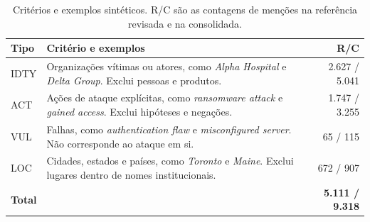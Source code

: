 \begin{table}[ht]
\centering
\caption{Critérios e exemplos sintéticos. R/C são as contagens de menções na referência revisada e na consolidada.}
\label{tab:anotacao}
\begin{tabular}{@{}l|p{10.8cm}|r@{}}
\hline
\textbf{Tipo} & \textbf{Critério e exemplos} & \textbf{R/C} \\
\hline
IDTY & Organizações vítimas ou atores, como \textit{Alpha Hospital} e \textit{Delta Group}. Exclui pessoas e produtos. & 2.627 / 5.041 \\
ACT & Ações de ataque explícitas, como \textit{ransomware attack} e \textit{gained access}. Exclui hipóteses e negações. & 1.747 / 3.255 \\
VUL & Falhas, como \textit{authentication flaw} e \textit{misconfigured server}. Não corresponde ao ataque em si. & 65 / 115 \\
LOC & Cidades, estados e países, como \textit{Toronto} e \textit{Maine}. Exclui lugares dentro de nomes institucionais. & 672 / 907 \\
\hline
\textbf{Total} & & \textbf{5.111 / 9.318} \\
\hline
\end{tabular}
\end{table}
